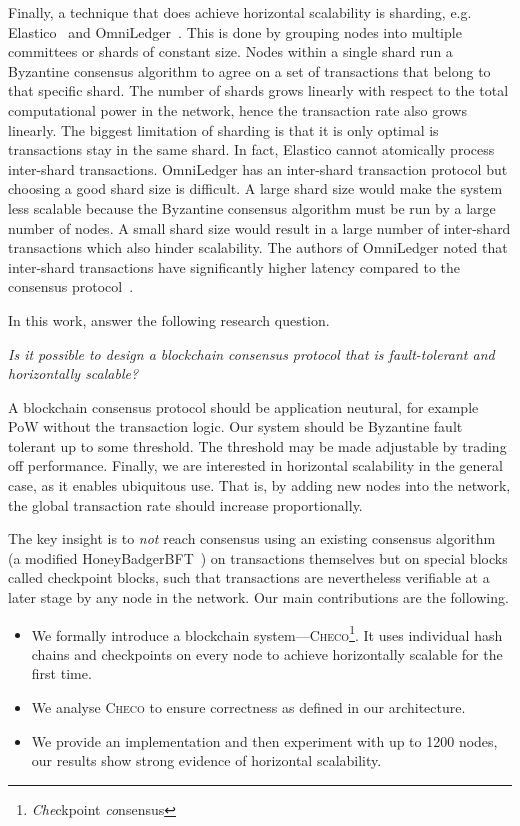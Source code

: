 Finally, a technique that does achieve horizontal scalability is sharding, e.g. Elastico~\cite{luu2016elastico} and OmniLedger~\cite{kokoris2017omniledger}.
This is done by grouping nodes into multiple committees or shards of constant size.
Nodes within a single shard run a Byzantine consensus algorithm to agree on a set of transactions that belong to that specific shard.
The number of shards grows linearly with respect to the total computational power in the network, hence the transaction rate also grows linearly.
The biggest limitation of sharding is that it is only optimal is transactions stay in the same shard.
In fact, Elastico cannot atomically process inter-shard transactions.
OmniLedger has an inter-shard transaction protocol but choosing a good shard size is difficult.
A large shard size would make the system less scalable because the Byzantine consensus algorithm must be run by a large number of nodes.
A small shard size would result in a large number of inter-shard transactions which also hinder scalability.
The authors of OmniLedger noted that inter-shard transactions have significantly higher latency compared to the consensus protocol~\cite{kokoris2017omniledger}.

In this work, answer the following research question.
\begin{displayquote}
\emph{Is it possible to design a blockchain consensus protocol that is fault-tolerant and horizontally scalable?}
\end{displayquote}
A blockchain consensus protocol should be application neutural,
for example PoW without the transaction logic.
Our system should be Byzantine fault tolerant up to some threshold.
The threshold may be made adjustable by trading off performance.
Finally, we are interested in horizontal scalability in the general case, as it enables ubiquitous use.
That is, by adding new nodes into the network, the global transaction rate should increase proportionally.

The key insight is to \emph{not} reach consensus using an existing consensus algorithm (a modified HoneyBadgerBFT~\cite{miller2016honey}) on transactions themselves but on special blocks called checkpoint blocks,
such that transactions are nevertheless verifiable at a later stage by any node in the network.
Our main contributions are the following.
\begin{itemize}
    \item We formally introduce a blockchain system---\textsc{Checo}\footnote{\emph{Che}ckpoint \emph{co}nsensus}.
        It uses individual hash chains and checkpoints on every node to achieve
        horizontally scalable for the first time.
    \item We analyse \textsc{Checo} to ensure correctness as defined in our architecture.
    \item We provide an implementation and then experiment with up to 1200 nodes,
        our results show strong evidence of horizontal scalability.
\end{itemize}

